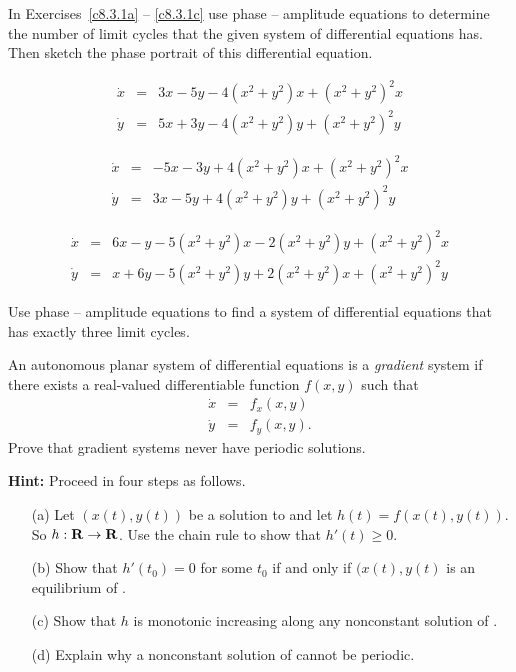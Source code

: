 \documentclass{ximera}
\begin{document}
\noindent In Exercises~\ref{c8.3.1a} -- \ref{c8.3.1c} use phase -- amplitude 
equations to determine the number of limit cycles that the given system of 
differential equations has.   Then sketch the phase portrait of this 
differential equation.
\begin{exercise} \label{c8.3.1a}
\[
\begin{array}{rcl}
\dot{x} & = &  3x-5y - 4(x^2+y^2)x + (x^2+y^2)^2x\\
\dot{y} & = &  5x+3y - 4(x^2+y^2)y + (x^2+y^2)^2y
\end{array} 
\]
\end{exercise}
\begin{exercise} \label{c8.3.1b}
\[ 
\begin{array}{rcl}
\dot{x} & = &  -5x-3y + 4(x^2+y^2)x + (x^2+y^2)^2x\\
\dot{y} & = &  3x-5y + 4(x^2+y^2)y + (x^2+y^2)^2y
\end{array}
\]
\end{exercise}
\begin{exercise} \label{c8.3.1c}
\[ 
\begin{array}{rcl}
\dot{x} & = &  6x-y - 5(x^2+y^2)x - 2(x^2+y^2)y + (x^2+y^2)^2x\\
\dot{y} & = &  x+6y - 5(x^2+y^2)y + 2(x^2+y^2)x + (x^2+y^2)^2y
\end{array}
\]
\end{exercise}

\begin{exercise} \label{c8.3.4}
Use phase -- amplitude equations to find a system of differential equations 
that has exactly three limit cycles.
\end{exercise}

\begin{exercise} \label{c8.3.5}
An autonomous planar system of differential equations is a {\em gradient\/} 
 system if there exists a real-valued differentiable function 
$f(x,y)$ such that 
\begin{equation} \label{E:gradsys}
\begin{array}{rcl}
\dot{x} & = & f_x(x,y) \\
\dot{y} & = & f_y(x,y).
\end{array}
\end{equation}
Prove that gradient systems never have periodic solutions.  

{\bf Hint:} Proceed in four steps as follows.
\begin{itemize}
\item[(a)]  Let $(x(t),y(t))$ be a solution to  and let 
$h(t)=f(x(t),y(t))$.  So $h:\mbox{$\bf{R}$}\to\mbox{$\bf{R}$}$.  Use the chain rule to show that 
$h'(t)\geq 0$.
\item[(b)]  Show that $h'(t_0) = 0$ for some $t_0$ if and only if 
$(x(t),y(t)$ is an equilibrium of  .
\item[(c)]  Show that $h$ is monotonic increasing along any nonconstant 
solution of . 
\item[(d)]  Explain why a nonconstant solution of  cannot be 
periodic.
\end{itemize}
\end{exercise}
\end{document}
